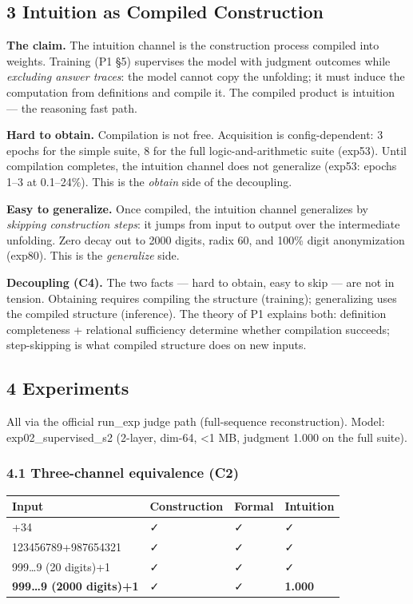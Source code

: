 \documentclass[
]{article}
\begin{document}
\subsection{3 Intuition as Compiled
Construction}\label{intuition-as-compiled-construction}

\textbf{The claim.} The intuition channel is the construction process
compiled into weights. Training (P1 §5) supervises the model with
judgment outcomes while \emph{excluding answer traces}: the model cannot
copy the unfolding; it must induce the computation from definitions and
compile it. The compiled product is intuition --- the reasoning fast
path.

\textbf{Hard to obtain.} Compilation is not free. Acquisition is
config-dependent: 3 epochs for the simple suite, 8 for the full
logic-and-arithmetic suite (exp53). Until compilation completes, the
intuition channel does not generalize (exp53: epochs 1--3 at 0.1--24\%).
This is the \emph{obtain} side of the decoupling.

\textbf{Easy to generalize.} Once compiled, the intuition channel
generalizes by \emph{skipping construction steps}: it jumps from input
to output over the intermediate unfolding. Zero decay out to 2000
digits, radix 60, and 100\% digit anonymization (exp80). This is the
\emph{generalize} side.

\textbf{Decoupling (C4).} The two facts --- hard to obtain, easy to skip
--- are not in tension. Obtaining requires compiling the structure
(training); generalizing uses the compiled structure (inference). The
theory of P1 explains both: definition completeness + relational
sufficiency determine whether compilation succeeds; step-skipping is
what compiled structure does on new inputs.

\subsection{4 Experiments}\label{experiments}

All via the official run\_exp judge path (full-sequence reconstruction).
Model: exp02\_supervised\_s2 (2-layer, dim-64, \textless1 MB, judgment
1.000 on the full suite).

\subsubsection{4.1 Three-channel equivalence
(C2)}\label{three-channel-equivalence-c2}

\begin{longtable}[]{@{}llll@{}}
\toprule\noalign{}
Input & Construction & Formal & Intuition \\
\midrule\noalign{}
\endhead
\bottomrule\noalign{}
\endlastfoot
12+34 & ✓ & ✓ & ✓ \\
123456789+987654321 & ✓ & ✓ & ✓ \\
999\ldots9 (20 digits)+1 & ✓ & ✓ & ✓ \\
\textbf{999\ldots9 (2000 digits)+1} & ✓ & ✓ & \textbf{1.000} \\
\end{longtable}
\end{document}
